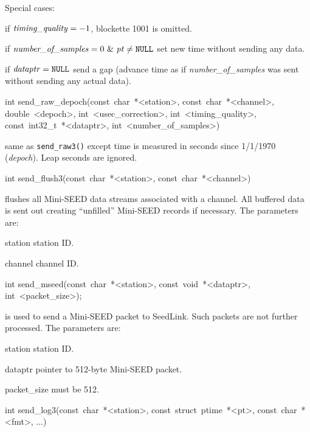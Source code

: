 \documentclass[11pt,a4paper,titlepage]{article}
\begin{document}
\begin{interface}
Special cases:
\begin{itemize}
\stditem if $\mbox{\textit{timing\_quality}} = -1$, blockette 1001 is
omitted.

\stditem if $\mbox{\textit{number\_of\_samples}} = 0\ \&\ \mbox{\textit{pt}}
\ne \mbox{\texttt{NULL}}$ set new time without sending any data.

\stditem if $\mbox{\textit{dataptr}} = \mbox{\texttt{NULL}}$ send a gap
(advance time as if \textit{number\_of\_samples} was sent without sending
any actual data).
\end{itemize}

\item int send_raw_depoch(const~char~*<station>, const~char~*<channel>,
            double~<depoch>, int~<usec_correction>, int~<timing_quality>,
            const~int32_t~*<dataptr>, int~<number_of_samples>)

same as \verb+send_raw3()+ except time is measured in seconds since
1/1/1970 (\textit{depoch}). Leap seconds are ignored.

\item int send_flush3(const~char~*<station>, const~char~*<channel>)

flushes all Mini-SEED data streams associated with a channel. All buffered
data is sent out creating ``unfilled'' Mini-SEED records if necessary.
The parameters are:
\begin{parameters}
\item[station] station ID.

\item[channel] channel ID.
\end{parameters}

\item int send_mseed(const~char~*<station>, const~void~*<dataptr>,
            int~<packet_size>);

is used to send a Mini-SEED packet to SeedLink. Such packets are not
further processed. The parameters are:
\begin{parameters}
\item[station] station ID.

\item[dataptr] pointer to 512-byte Mini-SEED packet.

\item[packet_size] must be 512.
\end{parameters}

\item int send_log3(const~char~*<station>, const~struct~ptime~*<pt>,
            const~char~*<fmt>, ...)


\end{interface}
\end{document}
